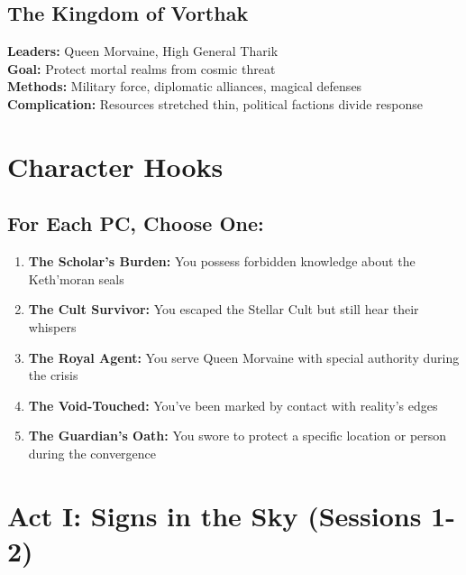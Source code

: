 \documentclass[12pt,twoside]{article}
\begin{document}
\subsection{The Kingdom of Vorthak}
\textbf{Leaders:} Queen Morvaine, High General Tharik\\
\textbf{Goal:} Protect mortal realms from cosmic threat\\
\textbf{Methods:} Military force, diplomatic alliances, magical defenses\\
\textbf{Complication:} Resources stretched thin, political factions divide response

\section{Character Hooks}

\subsection{For Each PC, Choose One:}
\begin{enumerate}[leftmargin=*]
\item \textbf{The Scholar's Burden:} You possess forbidden knowledge about the Keth'moran seals
\item \textbf{The Cult Survivor:} You escaped the Stellar Cult but still hear their whispers
\item \textbf{The Royal Agent:} You serve Queen Morvaine with special authority during the crisis
\item \textbf{The Void-Touched:} You've been marked by contact with reality's edges
\item \textbf{The Guardian's Oath:} You swore to protect a specific location or person during the convergence
\end{enumerate}

\section{Act I: Signs in the Sky (Sessions 1-2)}
\end{document}
